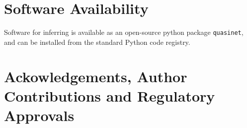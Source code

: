 \documentclass[onecolumn,10pt]{IEEEtran}
\begin{document}



 

\section*{Software Availability}
Software for inferring  is available as an open-source python package \texttt{quasinet}, and can be
installed from the standard Python code registry.


\section*{Ackowledgements, Author Contributions and Regulatory Approvals}
\end{document}
